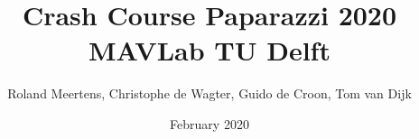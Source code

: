 \documentclass{report}
\begin{document}
\author{Roland Meertens, Christophe de Wagter, Guido de Croon, Tom van Dijk}
\title{\bf Crash Course Paparazzi 2020\\MAVLab TU Delft}
\date{February 2020}
\maketitle

\tableofcontents

\setlength{\parindent}{0em}





	
\end{document}
